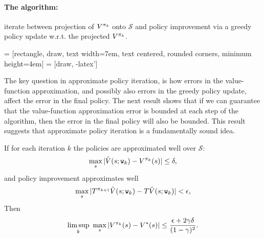 \paragraph{The algorithm:} iterate between projection of $V^{\pi_k}$ onto $\mathcal{S}$ and policy improvement via a greedy policy update w.r.t. the projected $V^{\pi_k}$.

\vspace{20pt}
 = [rectangle, draw,
    text width=7em, text centered, rounded corners, minimum height=4em]
 = [draw, -latex']
\vspace{20pt}

The key question in approximate policy iteration, is how errors in the value-function approximation, and possibly also errors in the greedy policy update, affect the error in the final policy. The next result shows that if we can guarantee that the value-function approximation error is bounded at each step of the algorithm, then the error in the final policy will also be bounded. This result suggests that approximate policy iteration is a fundamentally sound idea.

\begin{theorem}\label{thm:API}
If for each iteration $k$ the policies are approximated well over $\mathcal{S}$:
$$\max_s |\tilde{V}(s;\texttt{w}_k)-V^{\pi_k}(s)| \le \delta,$$
and policy improvement approximates well
$$ \max_s |T^{\pi_{k+1}}\tilde{V}(s;\texttt{w}_k) - T\tilde{V}(s;\texttt{w}_k)| < \epsilon,$$
Then
$$ \limsup_k \ \max_s | V^{\policy_k}(s)-V^*(s)| \le \frac{\epsilon+2\gamma\delta}{(1-\gamma)^2}.$$
\end{theorem}

